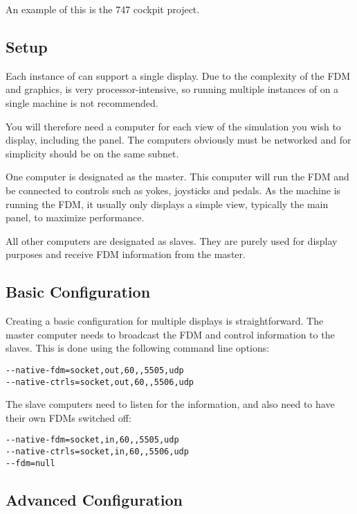 An example of this is the 747 cockpit project.

\noindent
{}

\subsection{Setup}

Each instance of \FlightGear{} can support a single display. Due to the
complexity of the FDM and graphics, \FlightGear{} is very processor-intensive,
so running multiple instances of \FlightGear{} on a single machine is not
recommended.

You will therefore need a computer for each view of the simulation you wish
to display, including the panel. The computers obviously must be networked
and for simplicity should be on the same subnet.

One computer is designated as the master. This computer will run the FDM and
be connected to controls such as yokes, joysticks and pedals. As the machine is
running the FDM, it usually only displays a simple view, typically the main
panel, to maximize performance.

All other computers are designated as slaves. They are purely used for display
purposes and receive FDM information from the master.

\subsection{Basic Configuration}

Creating a basic configuration for multiple displays is straightforward. The
master computer needs to broadcast the FDM and control information to the slaves.
This is done using the following command line options:

\begin{verbatim}
--native-fdm=socket,out,60,,5505,udp
--native-ctrls=socket,out,60,,5506,udp
\end{verbatim}

The slave computers need to listen for the information, and also need to have
their own FDMs switched off:

\begin{verbatim}
--native-fdm=socket,in,60,,5505,udp
--native-ctrls=socket,in,60,,5506,udp
--fdm=null
\end{verbatim}

\subsection{Advanced Configuration}

